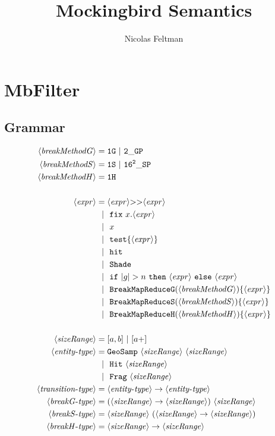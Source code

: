 \documentclass{article}
\title{\Large\textbf{Mockingbird Semantics}}
\author{Nicolas Feltman}
\newcommand {\myit} [1]{\operatorname{\it{#1}}}
\newcommand {\expr} {\langle\mathit{expr}\rangle}
\newcommand {\decompG} {\langle\mathit{breakMethodG}\rangle}
\newcommand {\decompS} {\langle\mathit{breakMethodS}\rangle}
\newcommand {\decompH} {\langle\mathit{breakMethodH}\rangle}
\newcommand {\sizeRange} {\langle\mathit{sizeRange}\rangle}
\newcommand {\gbar} {~~|~~}
\newcommand {\chain}{\mathtt{>>}}
\newcommand {\fix}{\mathtt{fix}}
\newcommand {\test}{\mathtt{test}}
\newcommand {\isect}{\mathtt{hit}}
\newcommand {\shade}{\mathtt{Shade}}
\newcommand {\bmrg}{\mathtt{BreakMapReduceG}}
\newcommand {\bmrs}{\mathtt{BreakMapReduceS}}
\newcommand {\bmrh}{\mathtt{BreakMapReduceH}}
\newcommand {\oneS}{\mathtt{1S}}
\newcommand {\oneG}{\mathtt{1G}}
\newcommand {\oneH}{\mathtt{1H}}
\newcommand {\sampP}{\mathtt{16^2\_SP}}
\newcommand {\twoGP}{\mathtt{2\_GP}}
\newcommand {\geosamp}{\mathtt{GeoSamp}}
\newcommand {\hit}{\mathtt{Hit}}
\newcommand {\frag}{\mathtt{Frag}}
\begin{document}
\maketitle

\section{MbFilter}

\subsection{Grammar}
\begin{align*}
\decompG &= \oneG~|~\twoGP \\
\decompS &= \oneS~|~\sampP \\
\decompH &= \oneH \\
\\
\expr &= \expr \chain \expr \\
&\gbar \fix~x. \expr \\
&\gbar x \\
&\gbar \test \{ \expr \} \\
&\gbar \isect \\
&\gbar \shade \\
&\gbar \mathtt{if~}|g| > n \mathtt{~then~} \expr \mathtt{~else~} \expr \\
&\gbar \bmrg (\decompG) \{ \expr \} \\
&\gbar \bmrs (\decompS) \{ \expr \} \\
&\gbar \bmrh (\decompH) \{ \expr \} \\
\\
\sizeRange &= [a,b]~|~[a+] \\
\langle\myit{entity-type}\rangle &= \geosamp~\sizeRange~\sizeRange\\
 &\gbar \hit~\sizeRange \\
 & \gbar \frag~\sizeRange \\
\langle\myit{transition-type}\rangle &= \langle\myit{entity-type}\rangle \to \langle\myit{entity-type}\rangle \\
\langle\myit{breakG-type}\rangle &= (\sizeRange \to \sizeRange)~\sizeRange  \\
\langle\myit{breakS-type}\rangle &= \sizeRange~(\sizeRange \to \sizeRange)  \\
\langle\myit{breakH-type}\rangle &= \sizeRange \to \sizeRange
\end{align*}
\end{document}
